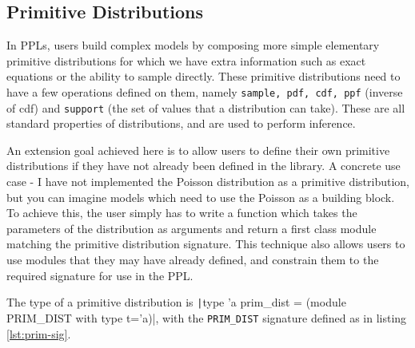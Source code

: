 \subsection{Primitive Distributions}
In PPLs, users build complex models by composing more simple elementary primitive distributions for which we have extra information such as exact equations or the ability to sample directly. These primitive distributions need to have a few operations defined on them, namely \texttt{sample, pdf, cdf, ppf} (inverse of cdf) and \texttt{support} (the set of values that a distribution can take). These are all standard properties of distributions, and are used to perform inference.

An extension goal achieved here is to allow users to define their own primitive distributions if they have not already been defined in the library. A concrete use case - I have not implemented the Poisson distribution as a primitive distribution, but you can imagine models which need to use the Poisson as a building block. To achieve this, the user simply has to write a function which takes the parameters of the distribution as arguments and return a first class module matching the primitive distribution signature. This technique also allows users to use modules that they may have already defined, and constrain them to the required signature for use in the PPL.
	
The type of a primitive distribution is \texttt|type 'a prim_dist = (module PRIM_DIST with type t='a)|, with the \texttt{PRIM\_DIST} signature defined as in listing \ref{lst:prim-sig}. 
	
\begin{figure}[!htb]
	\begin{minipage}{0.5\textwidth}
		\label{lst:prim-sig}
	\end{minipage}
	\begin{minipage}{0.5\textwidth}
		\label{lst:new-dist}
	\end{minipage}
\end{figure}
	
	
